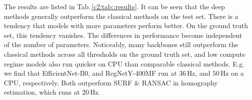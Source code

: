


The results are listed in Tab.\,\ref{c2:tab::results}. It can be seen that the deep methods generally outperform the classical methods on the test set. There is a tendency that models with more parameters perform better. On the ground truth set, this tendency vanishes. The differences in performance become independent of the number of parameters. Noticeably, many backbones still outperform the classical methods across all thresholds on the ground truth set, and low compute regime models also run quicker on CPU than comparable classical methods. E.g. we find that EfficientNet-B0, and RegNetY-400MF run at $36\,\text{Hz}$, and $50\,\text{Hz}$ on a CPU, respectively. Both outperform SURF \& RANSAC in homography estimation, which runs at $20\,\text{Hz}$.


